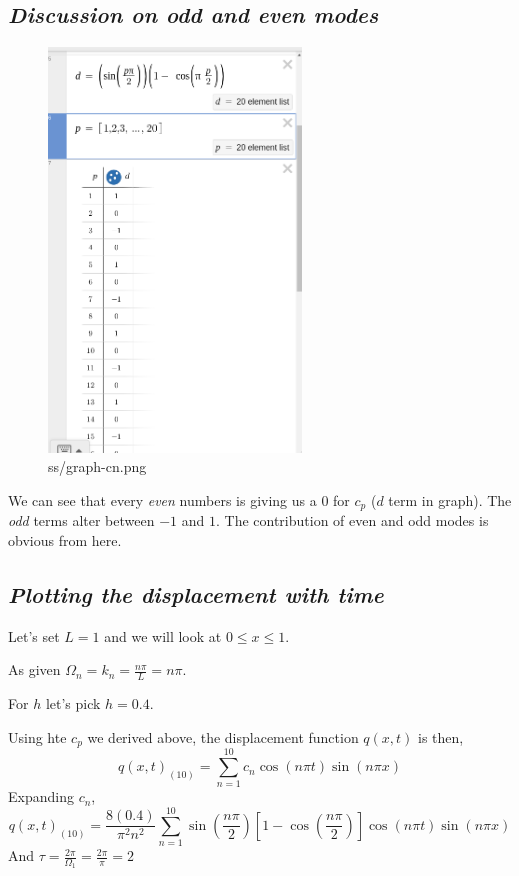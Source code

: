 \documentclass[letter]{article}
\begin{document}
\subsection*{\emph{Discussion on odd and even modes}}
\begin{figure}[H]
	\centering
	\includegraphics[width=0.6\textwidth]{ss/graph-cn.png}
	\caption{ss/graph-cn.png}
	\label{fig:ss-graph-cn-png}
\end{figure}
We can see that every \emph{even} numbers is giving us a $0$ for $c_p$ ($d$ term in graph). The \emph{odd} terms alter between $-1$ and $1$. The contribution of even and odd modes is obvious from here.   
\subsection*{\emph{Plotting the displacement with time}}
Let's set $L = 1$ and we will look at $0 \le  x \le 1$. 

As given $\Omega_n = k_n = \frac{n\pi}{L} = n \pi $. 

For $h$ let's pick $h = 0.4$. 

Using hte $c_p$ we derived above, the displacement function $q(x,t)$ is then, 
\[
	q(x,t)_{(10)}= 
\sum_{n=1}^{10} c_n \cos ( n \pi t) \sin(n \pi x)
\] 
Expanding $c_n$, 
\[
q(x,t)_{(10)} = \frac{8 (0.4)}{\pi ^2 n^2 } 
\sum_{n=1}^{10} \sin \left(\frac{n \pi }{2}\right) 
\left[ 
1 - \cos \left(\frac{n \pi }{2}\right)
\right] \cos \left( n \pi t\right) \sin (n \pi x)
\]
And $\tau = \frac{2\pi}{\Omega_1} = \frac{2 \pi }{\pi } = 2$
\newpage
\end{document}
